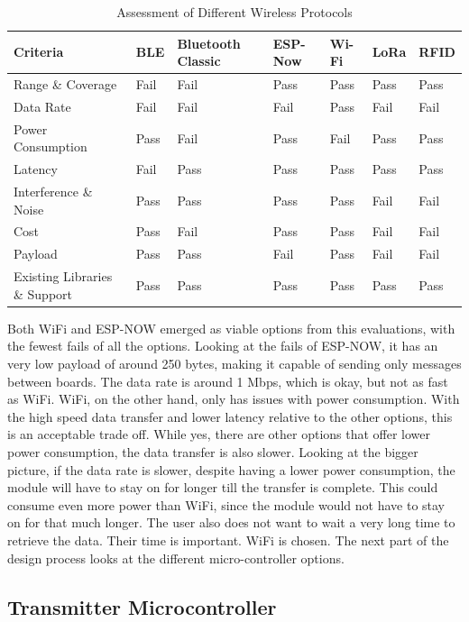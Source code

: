 \begin{table}[h]
\centering
\begin{tabular}{|l|l|l|l|l|l|l|}
\hline
\textbf{Criteria} & \textbf{BLE} & \textbf{Bluetooth Classic} & \textbf{ESP-Now} & \textbf{Wi-Fi} & \textbf{LoRa} & \textbf{RFID} \\
\hline
Range \& Coverage & Fail & Fail & Pass & Pass & Pass & Pass \\
\hline
Data Rate & Fail & Fail & Fail & Pass & Fail & Fail \\
\hline
Power Consumption & Pass & Fail & Pass & Fail & Pass & Pass \\
\hline
Latency & Fail & Pass & Pass & Pass & Pass & Pass \\
\hline
Interference \& Noise & Pass & Pass & Pass & Pass & Fail & Fail \\
\hline
Cost & Pass & Fail & Pass & Pass & Fail & Fail \\
\hline
Payload & Pass & Pass & Fail & Pass & Fail & Fail \\
\hline
Existing Libraries \& Support & Pass & Pass & Pass & Pass & Pass & Pass \\
\hline
\end{tabular}
\caption{Assessment of Different Wireless Protocols}
\label{tab:wireless_protocol_assessment}
\end{table}
Both WiFi and ESP-NOW emerged as viable options from this evaluations, with the fewest fails of all the options. Looking at the fails of ESP-NOW, it has an very low payload of around 250 bytes, making it capable of sending only messages between boards. The data rate is around 1 Mbps, which is okay, but not as fast as WiFi. 
WiFi, on the other hand, only has issues with power consumption. With the high speed data transfer and lower latency relative to the other options, this is an acceptable trade off. While yes, there are other options that offer lower power consumption, the data transfer is also slower. Looking at the bigger picture, if the data rate is slower, despite having a lower power consumption, the module will have to stay on for longer till the transfer is complete. This could consume even more power than WiFi, since the module would not have to stay on for that much longer. 
The user also does not want to wait a very long time to retrieve the data. Their time is important. WiFi is chosen. The next part of the design process looks at the different micro-controller options. 

\subsection{Transmitter Microcontroller}

